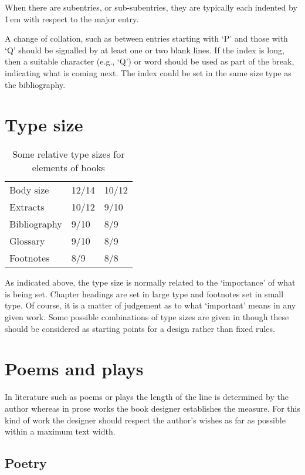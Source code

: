 \documentclass[10pt,letterpaper,extrafontsizes]{memoir}
\newcommand\U[2]{\textrm{#1}\,\textrm{#2}}
\begin{document}
    When there are subentries, or sub-subentries, they are typically
each indented by \U{1}{em} with respect to the major entry.

   A change of collation, such as between entries starting with `P' and those
with `Q' should be signalled by at least one or two blank lines. If the index
is long, then a suitable character (e.g., `Q') or word should be used as 
part of the break, indicating what is coming next. The index could be set
in the same size type as the bibliography.

\section{Type size}

\begin{table}
\centering
\caption{Some relative type sizes for elements of books}\label{tab:reltypesizing}
\begin{tabular}{lll} \toprule
Body size & 12/14  & 10/12 \\
Extracts  & 10/12 &  9/10 \\
Bibliography & 9/10 & 8/9 \\
Glossary     & 9/10 & 8/9 \\
Footnotes   & 8/9 & 8/8 \\
\bottomrule
\end{tabular}
\end{table}

    As indicated above, the type size is normally related to the `importance' 
of what is being set. Chapter headings are set in large type and footnotes 
set in small type. Of course, it is a matter of judgement as to what 
`important' means in any given work. Some possible combinations of type sizes
are given in  though these should be considered as
starting points for a design rather than fixed rules.

\section{Poems and plays}

    In literature such as poems or plays 
the length of the line is determined
by the author whereas in prose works the book designer establishes the measure.
For this kind of work the designer should respect the author's wishes as 
far as possible within a maximum text width.

\subsection{Poetry}
\end{document}
